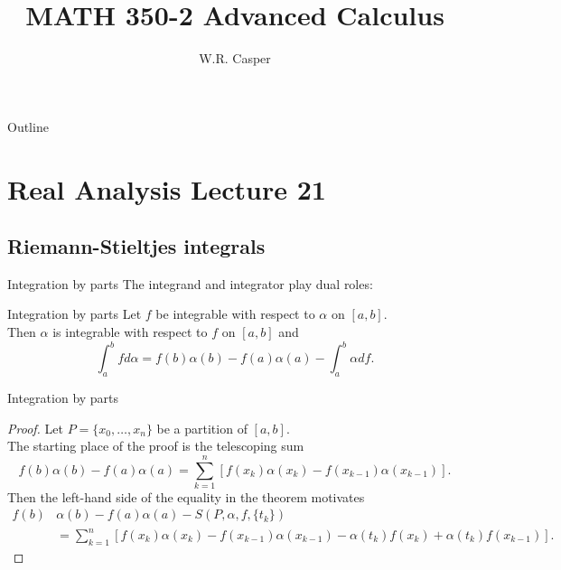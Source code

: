 \documentclass{beamer}
\title{MATH 350-2 Advanced Calculus}
\subtitle
{} %
\author[W.R. Casper] %
{W.R. Casper}
\institute[California State University Fullerton] %
{
  Department of Mathematics\\
  California State University Fullerton}
\begin{document}
\begin{frame}
  \titlepage
\end{frame}

\begin{frame}{Outline}
  \tableofcontents
\end{frame}



\section{Real Analysis Lecture 21}

\subsection{Riemann-Stieltjes integrals}

\begin{frame}{Integration by parts}
The integrand and integrator play dual roles:
\pause
\begin{thm}{Integration by parts}
\pause
Let $f$ be integrable with respect to $\alpha$ on $[a,b]$.\\
\pause
Then $\alpha$ is integrable with respect to $f$ on $[a,b]$ and
$$\int_a^b f d\alpha = f(b)\alpha(b)-f(a)\alpha(a)-\int_a^b \alpha df.$$
\end{thm}
\end{frame}

\begin{frame}{Integration by parts}
\begin{proof}
\pause
Let $P = \{x_0,\dots, x_n\}$ be a partition of $[a,b]$.\\
\pause
The starting place of the proof is the telescoping sum
$$f(b)\alpha(b)-f(a)\alpha(a) = \sum_{k=1}^n \left[f(x_k)\alpha(x_k)-f(x_{k-1})\alpha(x_{k-1})\right].$$
\pause
Then the left-hand side of the equality in the theorem motivates
{\small
\begin{align*}
f(b)&\alpha(b)-f(a)\alpha(a)-S(P,\alpha,f,\{t_k\})\\
  &= \sum_{k=1}^n\left[f(x_k)\alpha(x_k)-f(x_{k-1})\alpha(x_{k-1})-\alpha(t_k)f(x_k)+\alpha(t_k)f(x_{k-1})\right].
\end{align*}
}
\end{proof}
\end{frame}
\end{document}
